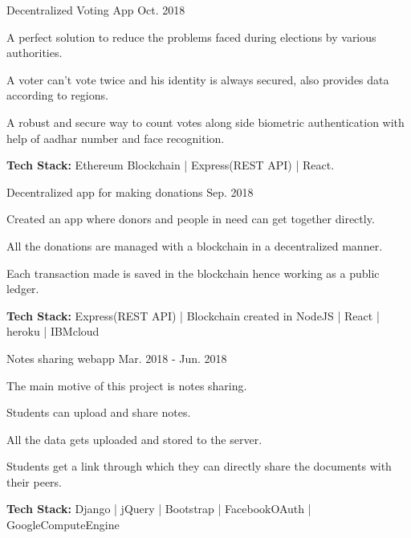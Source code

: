 \begin{cventries}
  \cventry
  {Decentralized Voting App}
  {\href{https://github.com/thakursaurabh1998/voting-dapp}{}}
  {}
  {Oct. 2018}
  {
    \begin{cvitems}
      \item A perfect solution to reduce the problems faced during elections by various authorities.
      \item A voter can't vote twice and his identity is always secured, also provides data according to regions.
      \item A robust and secure way to count votes along side biometric authentication with help of aadhar number and face recognition.
      \item \textbf{Tech Stack:} Ethereum Blockchain | Express(REST API) | React.
    \end{cvitems}
  }


  \cventry
  {Decentralized app for making donations}
  {\href{https://github.com/thakursaurabh1998/NGO-Helper}{}}
  {}
  {Sep. 2018}
  {
    \begin{cvitems}
      \item Created an app where donors and people in need can get together directly.
      \item All the donations are managed with a blockchain in a decentralized manner.
      \item Each transaction made is saved in the blockchain hence working as a public ledger.
      \item \textbf{Tech Stack:} Express(REST API) | Blockchain created in NodeJS | React | heroku | IBMcloud
    \end{cvitems}
    \vspace{5mm}
  }

  \cventry
  {Notes sharing webapp}
  {\href{https://github.com/thakursaurabh1998/endprep-django}{}}
  {}
  {Mar. 2018 - Jun. 2018}
  {
    \begin{cvitems}
      \item The main motive of this project is notes sharing.
      \item Students can upload and share notes.
      \item All the data gets uploaded and stored to the server.
      \item Students get a link through which they can directly share the documents with their peers.
      \item \textbf{Tech Stack:} Django | jQuery | Bootstrap | FacebookOAuth | GoogleComputeEngine
    \end{cvitems}
    \vspace{5mm}
  }

\end{cventries}

